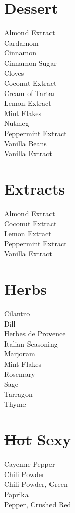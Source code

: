 \documentclass[twocolumn]{article}
\begin{document}
\normalem{}

\section*{Dessert}
Almond Extract\\
Cardamom\\
Cinnamon\\
Cinnamon Sugar\\
Cloves\\
Coconut Extract\\
Cream of Tartar\\
Lemon Extract\\
Mint Flakes\\
Nutmeg\\
Peppermint Extract\\
Vanilla Beans\\
Vanilla Extract\\

\section*{Extracts}
Almond Extract\\
Coconut Extract\\
Lemon Extract\\
Peppermint Extract\\
Vanilla Extract\\

\section*{Herbs}
Cilantro\\
Dill\\
Herbes de Provence\\
Italian Seasoning\\
Marjoram\\
Mint Flakes\\
Rosemary\\
Sage\\
Tarragon\\
Thyme\\

\section*{\sout{Hot} Sexy}
Cayenne Pepper\\
Chili Powder\\
Chili Powder, Green\\
Paprika\\
Pepper, Crushed Red\\
\end{document}
